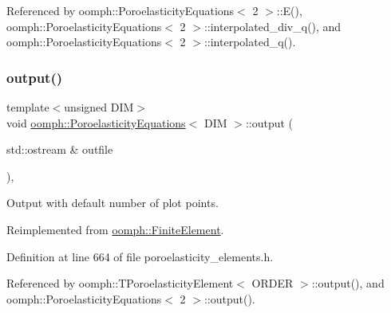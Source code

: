 Referenced by oomph\+::\+Poroelasticity\+Equations$<$ 2 $>$\+::\+E(), oomph\+::\+Poroelasticity\+Equations$<$ 2 $>$\+::interpolated\+\_\+div\+\_\+q(), and oomph\+::\+Poroelasticity\+Equations$<$ 2 $>$\+::interpolated\+\_\+q().

\mbox{\label{classoomph_1_1PoroelasticityEquations_ad5814c1fe98f24ded82b5f9b50fa1fb1}} 
\subsubsection{\texorpdfstring{output()}{output()}\hspace{0.1cm}{\footnotesize\ttfamily [1/2]}}
{\footnotesize\ttfamily template$<$unsigned D\+IM$>$ \\
void \hyperlink{classoomph_1_1PoroelasticityEquations}{oomph\+::\+Poroelasticity\+Equations}$<$ D\+IM $>$\+::output (\begin{DoxyParamCaption}\item[{std\+::ostream \&}]{outfile }\end{DoxyParamCaption})\hspace{0.3cm}{\ttfamily [inline]}, {\ttfamily [virtual]}}



Output with default number of plot points. 



Reimplemented from \hyperlink{classoomph_1_1FiniteElement_a2ad98a3d2ef4999f1bef62c0ff13f2a7}{oomph\+::\+Finite\+Element}.



Definition at line 664 of file poroelasticity\+\_\+elements.\+h.



Referenced by oomph\+::\+T\+Poroelasticity\+Element$<$ O\+R\+D\+E\+R $>$\+::output(), and oomph\+::\+Poroelasticity\+Equations$<$ 2 $>$\+::output().

\mbox{\label{classoomph_1_1PoroelasticityEquations_aa7a99329f02fc199b45e8f1db6b1b0c0}} 
